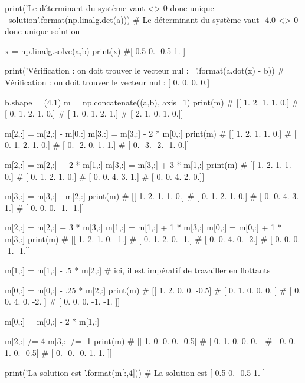 \documentclass[10pt,fleqn]{article} %
\begin{document}
\begin{multicols}{2}
\begin{corrige}
\begin{python}
print('Le déterminant du système vaut {} <> 0 donc unique \
solution'.format(np.linalg.det(a)))
# Le déterminant du système vaut -4.0 <> 0 donc unique solution

x = np.linalg.solve(a,b)
print(x)
#[-0.5  0.  -0.5  1. ]

print('Vérification : on doit trouver le vecteur nul : \
{}'.format(a.dot(x) - b))
# Vérification : on doit trouver le vecteur nul : [ 0.  0.  0.  0.]

b.shape = (4,1)
m = np.concatenate((a,b), axis=1)
print(m)
# [[ 1.  2.  1.  1.  0.]
#  [ 0.  1.  2.  1.  0.]
#  [ 1.  0.  1.  2.  1.]
#  [ 2.  1.  0.  1.  0.]]

m[2,:] = m[2,:] - m[0,:]
m[3,:] = m[3,:] - 2 * m[0,:]
print(m)
# [[ 1.  2.  1.  1.  0.]
#  [ 0.  1.  2.  1.  0.]
#  [ 0. -2.  0.  1.  1.]
#  [ 0. -3. -2. -1.  0.]]

m[2,:] = m[2,:] + 2 * m[1,:]
m[3,:] = m[3,:] + 3 * m[1,:]
print(m)
# [[ 1.  2.  1.  1.  0.]
#  [ 0.  1.  2.  1.  0.]
#  [ 0.  0.  4.  3.  1.]
#  [ 0.  0.  4.  2.  0.]]

m[3,:] = m[3,:] - m[2,:]
print(m)
# [[ 1.  2.  1.  1.  0.]
#  [ 0.  1.  2.  1.  0.]
#  [ 0.  0.  4.  3.  1.]
#  [ 0.  0.  0. -1. -1.]]

m[2,:] = m[2,:] + 3 * m[3,:]
m[1,:] = m[1,:] + 1 * m[3,:]
m[0,:] = m[0,:] + 1 * m[3,:]
print(m)
# [[ 1.  2.  1.  0. -1.]
#  [ 0.  1.  2.  0. -1.]
#  [ 0.  0.  4.  0. -2.]
#  [ 0.  0.  0. -1. -1.]]

m[1,:] = m[1,:] - .5 * m[2,:]
# ici, il est impératif de travailler en flottants

m[0,:] = m[0,:] - .25 * m[2,:]
print(m)
# [[ 1.   2.   0.   0.  -0.5]
#  [ 0.   1.   0.   0.   0. ]
#  [ 0.   0.   4.   0.  -2. ]
#  [ 0.   0.   0.  -1.  -1. ]]

m[0,:] = m[0,:] - 2 * m[1,:]

m[2,:] /= 4
m[3,:] /= -1
print(m)
# [[ 1.   0.   0.   0.  -0.5]
#  [ 0.   1.   0.   0.   0. ]
#  [ 0.   0.   1.   0.  -0.5]
#  [-0.  -0.  -0.   1.   1. ]]

print('La solution est {}'.format(m[:,4]))
# La solution est [-0.5  0.  -0.5  1. ]


\end{python}
\end{corrige}
\else
\fi



\end{multicols}
\end{document}
